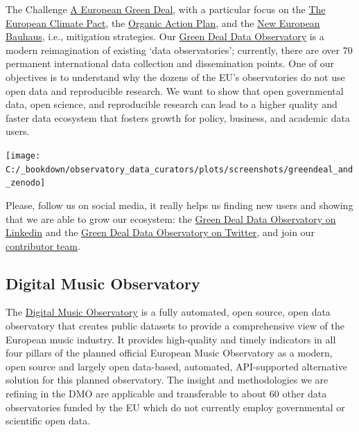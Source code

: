 \documentclass[
  a4paper,
  openany, a4paper, oneside]{book}
\begin{document}
The Challenge \href{https://ec.europa.eu/info/strategy/priorities-2019-2024/european-green-deal_en}{A European Green Deal}, with a particular focus on the \href{https://ec.europa.eu/commission/presscorner/detail/en/ip_20_2323}{The European Climate Pact}, the \href{https://ec.europa.eu/info/food-farming-fisheries/farming/organic-farming/organic-action-plan_en}{Organic Action Plan}, and the \href{https://ec.europa.eu/commission/presscorner/detail/en/IP_21_111}{New European Bauhaus}, i.e., mitigation strategies. Our \href{http://greendeal.dataobservatory.eu/}{Green Deal Data Observatory} is a modern reimagination of existing `data observatories'; currently, there are over 70 permanent international data collection and dissemination points. One of our objectives is to understand why the dozens of the EU's observatories do not use open data and reproducible research. We want to show that open governmental data, open science, and reproducible research can lead to a higher quality and faster data ecosystem that fosters growth for policy, business, and academic data users.

\begin{center}\texttt{[image: C:/\_bookdown/observatory\_data\_curators/plots/screenshots/greendeal\_and\_zenodo]} \end{center}

Please, follow us on social media, it really helps us finding new users and showing that we are able to grow our ecosystem: the \href{https://www.linkedin.com/company/78556699}{Green Deal Data Observatory on Linkedin} and the \href{https://twitter.com/GreenDealObs}{Green Deal Data Observatory on Twitter}, and join our \href{https://greendeal.dataobservatory.eu/\#contributors}{contributor team}.

\hypertarget{digital-music-observatory}{%
\subsection*{Digital Music Observatory}\label{digital-music-observatory}}

The \href{https://music.dataobservatory.eu/}{Digital Music Observatory} is a fully automated, open source, open data observatory that creates public datasets to provide a comprehensive view of the European music industry. It provides high-quality and timely indicators in all four pillars of the planned official European Music Observatory as a modern, open source and largely open data-based, automated, API-supported alternative solution for this planned observatory. The insight and methodologies we are refining in the DMO are applicable and transferable to about 60 other data observatories funded by the EU which do not currently employ governmental or scientific open data.
\end{document}
